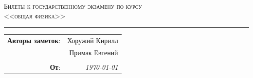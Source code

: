 
\begin{center}
    \LARGE \textsc{Билеты к государственному экзамену по курсу \\ <<общая физика>>}
\end{center}

\hrule

\phantom{42}

\begin{flushright}
    \begin{tabular}{rr}
        \textbf{Авторы заметок}: 
        & Хоружий Кирилл \\
        & Примак Евгений \\
        & \\
        \textbf{От}: &
        \textit{\today}\\
    \end{tabular}
\end{flushright}


\thispagestyle{empty}

\vspace{10mm}

